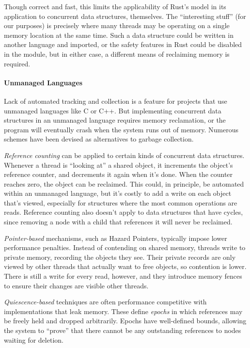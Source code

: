 Though correct and fast, this limits the applicability of Rust's model in its application to concurrent data structures, themselves.  The ``interesting stuff'' (for our purposes) is precisely where many threads may be operating on a single memory location at the same time.  Such a data structure could be written in another language and imported, or the safety features in Rust could be disabled in the module, but in either case, a different means of reclaiming memory is required.

\paragraph{Unmanaged Languages} Lack of automated tracking and collection is a feature for projects that use unmanaged languages like C or C++.  But implementing concurrent data structures in an unmanaged language requires memory reclamation, or the program will eventually crash when the system runs out of memory.  Numerous schemes have been devised as alternatives to garbage collection.  

\textit{Reference counting} can be applied to certain kinds of concurrent data structures\cite{DMMS}\cite{GPST09}.  Whenever a thread is ``looking at'' a shared object, it increments the object's reference counter, and decrements it again when it's done.  When the counter reaches zero, the object can be reclaimed.  This could, in principle, be automated within an unmanaged language, but it's costly to add a write on each object that's viewed, especially for structures where the most common operations are reads.  Reference counting also doesn't apply to data structures that have cycles, since removing a node with a child that references it will never be reclaimed.

\textit{Pointer-based} mechanisms, such as Hazard Pointers\cite{HP}\cite{DTA}, typically impose lower performance penalties.  Instead of contending on shared memory, threads write to private memory, recording the objects they see.  Their private records are only viewed by other threads that actually want to free objects, so contention is lower.  There is still a write for every read, however, and they introduce memory fences to ensure their changes are visible other threads.

\textit{Quiescence-based} techniques\cite{FraserH07}\cite{Harris}\cite{Hart} are often performance competitive with implementations that leak memory.  These define \textit{epochs} in which references may be freely held and dropped arbitrarily.  Epochs have well-defined bounds, allowing the system to ``prove'' that there cannot be any outstanding references to nodes waiting for deletion.

